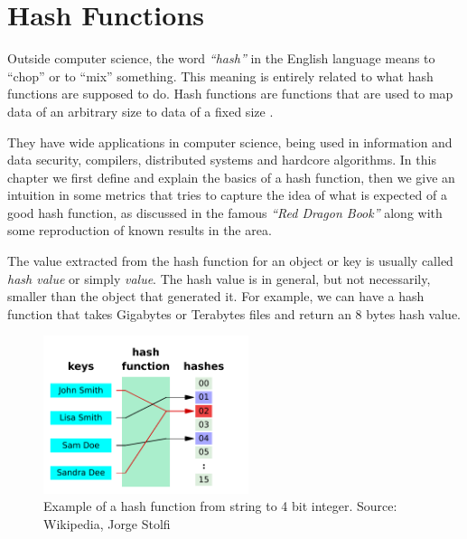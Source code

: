 \chapter{Hash Functions}
\label{cap:Hash Functions}


Outside computer science, the word \textit{``hash''} in the English language means to ``chop'' or to ``mix'' something. This meaning is entirely related to what hash functions are supposed to do. Hash functions are functions that are used to map data of an arbitrary size to data of a fixed size \citep{HashFuncWiki}.

They have wide applications in computer science, being used in information and data security, compilers, distributed systems and hardcore algorithms. In this chapter we first define and explain the basics of a hash function, then we give an intuition in some metrics that tries to capture the idea of what is expected of a good hash function, as discussed in the famous \textit{``Red Dragon Book''} \citep{DragonBook} along with some reproduction of known results in the area.

The value extracted from the hash function for an object or key is usually called \textit{hash value} or simply \textit{value}. The hash value is in general, but not necessarily, smaller than the object that generated it. For example, we can have a hash function that takes Gigabytes or Terabytes files and return an 8 bytes hash value.

\begin{figure}[h!]
  \centering
  \includegraphics[width=6cm]{figuras/hash-function.pdf}
  \caption{Example of a hash function from string to 4 bit integer. Source: Wikipedia, Jorge Stolfi }
\end{figure}

